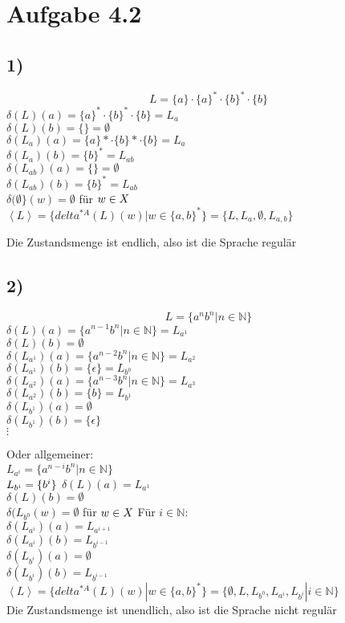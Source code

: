 \section*{Aufgabe 4.2}
\subsection*{1)}
\[L=\{a\}\cdot\{a\}^*\cdot\{b\}^*\cdot\{b\}\]
$\delta(L)(a)=\{a\}^*\cdot\{b\}^*\cdot\{b\}=L_a$\\
$\delta(L)(b)=\{\}=\emptyset$\\
$\delta(L_a)(a)=\{a\}*\cdot\{b\}*\cdot\{b\}=L_a$\\
$\delta(L_a)(b)=\{b\}^*=L_{ab}$\\
$\delta(L_{ab})(a)=\{\}=\emptyset$\\
$\delta(L_{ab})(b)=\{b\}^*=L_{ab}$\\
$\delta(\emptyset\}(w)=\emptyset$ für $w\in X\\$
$\left<L\right>=\{delta^{*A}(L)(w)|w\in \{a,b\}^*\}=\{L, L_a, \emptyset, L_{a,b}\}$

Die Zustandsmenge ist endlich, also ist die Sprache regulär

\subsection*{2)}
\[L=\{a^nb^n | n\in\mathbb{N}\}\]
$\delta(L)(a)=\{a^{n-1}b^n|n\in \mathbb{N}\}=L_{a^1}$\\
$\delta(L)(b)=\emptyset$\\
$\delta(L_{a^1})(a)=\{a^{n-2}b^n|n \in\mathbb{N}\}=L_{a^2}$\\
$\delta(L_{a^1})(b)=\{\epsilon\}=L_{b^0}$\\
$\delta(L_{a^2})(a)=\{a^{n-3}b^n|n\in\mathbb{N}\}=L_{a^3}$\\
$\delta(L_{a^2})(b)=\{b\}=L_{b^1}$\\
$\delta(L_{b^1})(a)=\emptyset$\\
$\delta(L_{b^1})(b)=\{\epsilon\}$\\
$\vdots$

Oder allgemeiner:\\
$L_{a^i}=\{a^{n-i}b^n|n\in\mathbb{N}\}$\\
$L_{b^i}=\{b^i\}\\$
$\delta(L)(a)=L_{a^1}$\\
$\delta(L)(b)=\emptyset$\\
$\delta(L_{b^0}(w)=\emptyset$ für $w\in X\\$
Für $i\in\mathbb{N}$:\\
$\delta(L_{a^i})(a)=L_{a^{i+1}}$\\
$\delta(L_{a^i})(b)=L_{b^{i-1}}$\\
$\delta(L_{b^i})(a)=\emptyset$\\
$\delta(L_{b^i})(b)=L_{b^{i-1}}$\\
$\left<L\right>=\{delta^{*A}(L)(w)|w\in \{a,b\}^*\}=\{\emptyset, L, L_{b^0}, L_{a^i}, L_{b^i} | i \in \mathbb{N} \}$\\

Die Zustandsmenge ist unendlich, also ist die Sprache nicht regulär
